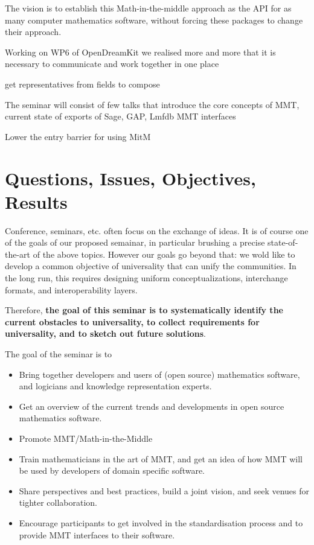 The vision is to establish this Math-in-the-middle approach as the API for as
many computer mathematics software, without forcing these packages to change
their approach.

Working on WP6 of OpenDreamKit we realised more and more that it is necessary to
communicate and work together in one place

get representatives from fields to compose

The seminar will consist of few talks that introduce the core concepts of MMT,
current state of exports of Sage, GAP, Lmfdb MMT interfaces

Lower the entry barrier for using MitM

\section{Questions, Issues, Objectives, Results}

Conference, seminars, etc. often focus on the exchange of ideas. It is
of course one of the goals of our proposed semainar, in particular
brushing a precise state-of-the-art of the above topics. 
However our goals go beyond that: we wold like to develop a common
objective of universality that can unify the communities. In the long run, this requires designing uniform conceptualizations, interchange formats, and interoperability layers.

Therefore, \textbf{the goal of this seminar is to systematically identify the
current obstacles to universality, to collect requirements for universality, and
to sketch out future solutions}.

The goal of the seminar is to 
\begin{itemize}
\item Bring together developers and users of (open source) mathematics software,
  and logicians and knowledge representation experts.
\item Get an overview of the current trends and developments in open source
  mathematics software.
\item Promote MMT/Math-in-the-Middle
\item Train mathematicians in the art of MMT, and get an idea of how MMT will be
  used by developers of domain specific software.
\item Share perspectives and best practices, build a joint vision, and
  seek venues for tighter collaboration.
\item Encourage participants to get involved in the standardisation process and
  to provide MMT interfaces to their software.
\end{itemize}


